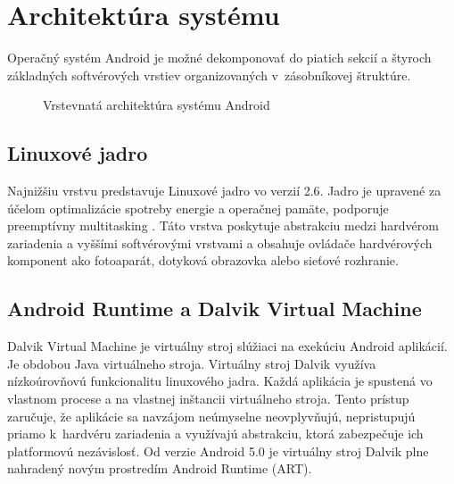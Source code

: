 \section{Architektúra systému}
Operačný systém Android je možné dekomponovať do piatich sekcií a štyroch základných softvérových vrstiev organizovaných v~zásobníkovej štruktúre.
\begin{figure} [htb]
 \centering
  \caption{Vrstevnatá architektúra systému Android}
  \label{fig:mulogo1}
\end{figure}
\subsection{Linuxové jadro}
Najnižšiu vrstvu predstavuje Linuxové jadro vo verzií 2.6. Jadro je upravené za účelom optimalizácie spotreby energie a operačnej pamäte, podporuje preemptívny multitasking . Táto vrstva poskytuje abstrakciu medzi hardvérom zariadenia a vyššími softvérovými vrstvami a obsahuje ovládače hardvérových komponent ako fotoaparát, dotyková obrazovka alebo sieťové rozhranie.
\subsection{Android Runtime a Dalvik Virtual Machine}
Dalvik Virtual Machine je virtuálny stroj slúžiaci na exekúciu Android aplikácií. Je obdobou Java virtuálneho stroja. Virtuálny stroj Dalvik využíva nízkoúrovňovú funkcionalitu linuxového jadra. Každá aplikácia je spustená vo vlastnom procese a na vlastnej inštancii virtuálneho stroja. Tento prístup zaručuje, že aplikácie sa navzájom neúmyselne neovplyvňujú, nepristupujú priamo k~hardvéru zariadenia a využívajú abstrakciu, ktorá zabezpečuje ich platformovú nezávislosť.  Od verzie Android 5.0 je virtuálny stroj Dalvik plne nahradený novým prostredím Android Runtime (ART).
